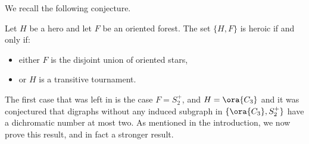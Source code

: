 We recall the following conjecture.

\begin{conjecture}\label{conj:oriented}
Let $H$ be a hero and let $F$ be an oriented forest. The set $\{  H, F\}$ is heroic if and only if:
\begin{itemize}
\item either $F$ is the disjoint union of oriented stars,
\item or $H$ is a transitive tournament.
\end{itemize}
\end{conjecture}

The first case that was left in \cite{ACN21} is the case $F=S^+_2$, and $H=\ora{C_{3}}$ and it was conjectured that digraphs 
without any induced subgraph in $\{  \ora{C_3}, S^+_2\}$
 have a dichromatic number at most two. 
As mentioned in the introduction, we now prove this result, and in fact a stronger result. 




